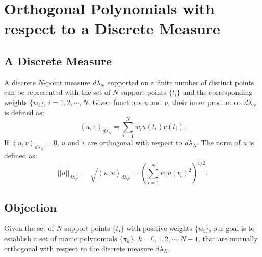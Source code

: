 \documentclass[11pt,letter]{article}
\begin{document}
\section{Orthogonal Polynomials with respect to a Discrete Measure}

\subsection{A Discrete Measure}

A discrete $N$-point measure $d\lambda_N$ supported on a finite number of distinct points can be represented with the set of $N$ support points $\{t_i\}$ and the corresponding weights $\{w_i\}$, $i=1,2,\cdots,N$. Given functions $u$ and $v$, their inner product on $d\lambda_N$ is defined as:
\begin{equation}
\label{eqn:def_inner_product}
\left<u,v\right>_{d\lambda_N}=\sum_{i=1}^N w_iu(t_i)v(t_i).
\end{equation}
If $\left<u,v\right>_{d\lambda_N}=0$, $u$ and $v$ are orthogonal with respect to ${d\lambda_N}$.
The norm of $u$ is defined as:
$$||u||_{d\lambda_N}=\sqrt[]{\left<u,u\right>_{d\lambda_N}}=\left(\sum_{i=1}^N w_iu(t_i)^2\right)^{1/2}.$$

\subsection{Objection}
Given the set of $N$ support points $\{t_i\}$ with positive weights $\{w_i\}$, our goal is to establish a set of monic polynomials $\{\pi_k\}$, $k=0,1,2,\cdots,N-1$, that are mutually orthogonal with respect to the discrete measure $d\lambda_N$.
\end{document}
